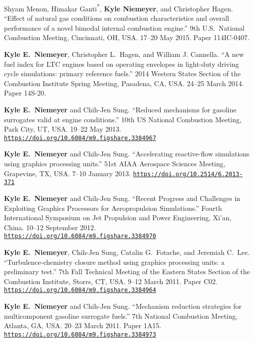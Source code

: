 \documentclass[margin,line,11pt]{res}
\makeatletter
\newlength{\bibhang}
\newlength{\bibsep}
 {\@listi \global\bibsep\itemsep \global\advance\bibsep by\parsep}
\newenvironment{bibenum*}
  {\renewcommand\labelenumi{\theenumi.}%
   \etaremune[
     topsep=0pt,
     itemsep=\bibsep,
     parsep=0pt,partopsep=0pt,
     itemindent=-\bibhang,
     leftmargin={\bibhang+\widthof{[999]}}]}
  {\endetaremune}
\newcommand*{\doi}[1]{\href{https://doi.org/#1}{\nolinkurl{https://doi.org/#1}}}
\makeatother
\begin{document}
\begin{resume}
\begin{bibenum*}
\item Shyam Menon, Himakar Ganti\textsuperscript{*}, \textbf{Kyle Niemeyer}, and Christopher Hagen.
``Effect of natural gas conditions on combustion characteristics and overall performance of a novel bimodal internal combustion engine.''
9th U.S.~National Combustion Meeting, Cincinnati, OH, USA.
17--20 May 2015.
Paper 114IC-0407.

\item \textbf{Kyle E.~Niemeyer}, Christopher L.\ Hagen, and William J. Cannella.
``A new fuel index for LTC engines based on operating envelopes in light-duty driving cycle simulations: primary reference fuels.''
2014 Western States Section of the Combustion Institute Spring Meeting, Pasadena, CA, USA.
24--25 March 2014.
Paper 14S-20.

\item \textbf{Kyle E.~Niemeyer} and Chih-Jen Sung.
``Reduced mechanisms for gasoline surrogates valid at engine conditions.''
10th US National Combustion Meeting, Park City, UT, USA.
19--22 May 2013.
\doi{10.6084/m9.figshare.3384967}

\item \textbf{Kyle E.~Niemeyer} and Chih-Jen Sung.
``Accelerating reactive-flow simulations using graphics processing units.''
51st AIAA Aerospace Sciences Meeting, Grapevine, TX, USA.
7--10 January 2013.
\doi{10.2514/6.2013-371}

\item \textbf{Kyle E.~Niemeyer} and Chih-Jen Sung.
``Recent Progress and Challenges in Exploiting Graphics Processors for Aeropropulsion Simulations.''
Fourth International Symposium on Jet Propulsion and Power Engineering, Xi'an, China.
10--12 September 2012. \\
\doi{10.6084/m9.figshare.3384970}

\item \textbf{Kyle E.~Niemeyer}, Chih-Jen Sung, Catalin G.\ Fotache, and Jeremiah C.\ Lee.
``Turbulence-chemistry closure method using graphics processing units: a preliminary test.''
7th Fall Technical Meeting of the Eastern States Section of the Combustion Institute, Storrs, CT, USA.
9--12 March 2011.
Paper C02.
\doi{10.6084/m9.figshare.3384964}

\item \textbf{Kyle E.~Niemeyer} and Chih-Jen Sung.
``Mechanism reduction strategies for multicomponent gasoline surrogate fuels.''
7th National Combustion Meeting, Atlanta, GA, USA.
20--23 March 2011.
Paper 1A15.
\doi{10.6084/m9.figshare.3384973}


\end{bibenum*}
\end{resume}
\end{document}
